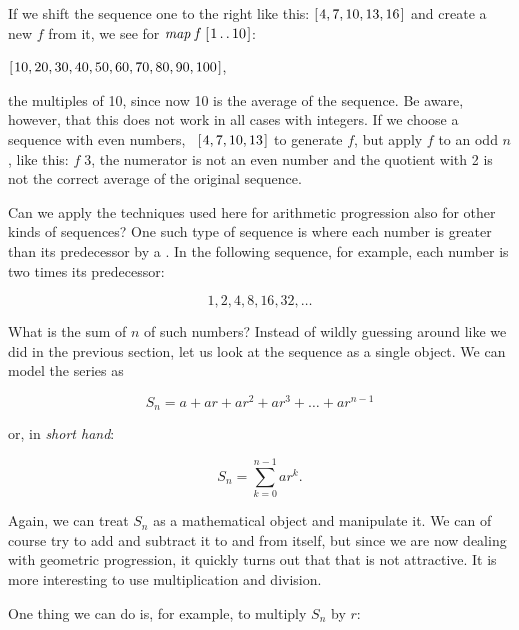 \documentclass{scrreprt}
\newcommand{\Varid}[1]{\mathit{#1}}
\begin{document}
If we shift the sequence one to the right like this:
\ensuremath{[\mskip1.5mu \mathrm{4},\mathrm{7},\mathrm{10},\mathrm{13},\mathrm{16}\mskip1.5mu]} and create a new $f$ from it,
we see for \ensuremath{\Varid{map}\;\Varid{f}\;[\mskip1.5mu \mathrm{1}\mathinner{\ldotp\ldotp}\mathrm{10}\mskip1.5mu]}:

\ensuremath{[\mskip1.5mu \mathrm{10},\mathrm{20},\mathrm{30},\mathrm{40},\mathrm{50},\mathrm{60},\mathrm{70},\mathrm{80},\mathrm{90},\mathrm{100}\mskip1.5mu]},

the multiples of 10, since now 10 is the average of the sequence.
Be aware, however, that this does not work in all cases
with integers. If we choose a sequence with even numbers,
\eg\ \ensuremath{[\mskip1.5mu \mathrm{4},\mathrm{7},\mathrm{10},\mathrm{13}\mskip1.5mu]} to generate $f$, but apply $f$ to an odd $n$,
like this: \ensuremath{\Varid{f}\;\mathrm{3}}, the numerator is not an even number
and the quotient with 2 is not the correct average
of the original sequence.

Can we apply the techniques used here for arithmetic progression
also for other kinds of sequences? 
One such type of sequence is  
where each number is greater than its predecessor by a .
In the following sequence, for example, each number
is two times its predecessor:

\[
1, 2, 4, 8, 16, 32, \dots
\]

What is the sum of $n$ of such numbers?
Instead of wildly guessing around 
like we did in the previous section,
let us look at the sequence as a single object.
We can model the series as

\begin{equation}
S_n=a + ar + ar^2 + ar^3 + \dots + ar^{n-1}
\end{equation}

or, in \emph{short hand}:

\begin{equation}
S_n = \sum_{k=0}^{n-1}{ar^k}.
\end{equation}

Again, we can treat $S_n$ as a mathematical object
and manipulate it. We can of course try to add and subtract
it to and from itself, but since we are now dealing with
geometric progression, it quickly turns out that that is
not attractive. It is more interesting 
to use multiplication and division.

One thing we can do is, for example,
to multiply $S_n$ by $r$:
\end{document}
